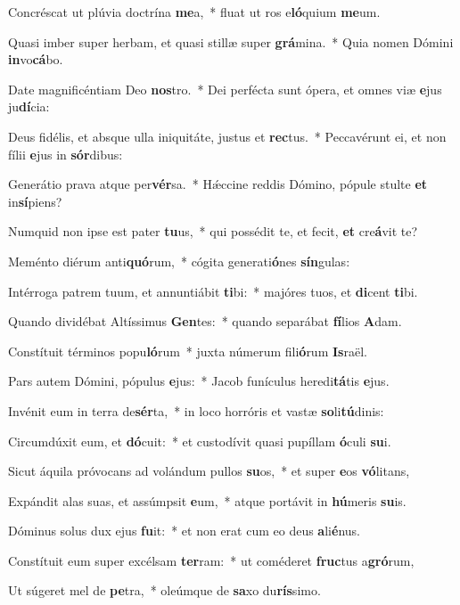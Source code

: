 \item Concréscat ut plúvia doctrína \textbf{me}a,~* fluat ut ros e\textbf{ló}quium \textbf{me}um.
\item Quasi imber super herbam, et quasi stillæ super \textbf{grá}mina.~* Quia nomen Dómini \textbf{in}vo\textbf{cá}bo.
\item Date magnificéntiam Deo \textbf{nos}tro.~* Dei perfécta sunt ópera, et omnes viæ \textbf{e}jus ju\textbf{dí}cia:
\item Deus fidélis, et absque ulla iniquitáte, justus et \textbf{rec}tus.~* Peccavérunt ei, et non fílii \textbf{e}jus in \textbf{sór}dibus:
\item Generátio prava atque per\textbf{vér}sa.~* Hǽccine reddis Dómino, pópule stulte \textbf{et} in\textbf{sí}piens?
\item Numquid non ipse est pater \textbf{tu}us,~* qui possédit te, et fecit, \textbf{et} cre\textbf{á}vit te?
\item Meménto diérum anti\textbf{quó}rum,~* cógita generati\textbf{ó}nes \textbf{sín}gulas:
\item Intérroga patrem tuum, et annuntiábit \textbf{ti}bi:~* majóres tuos, et \textbf{di}cent \textbf{ti}bi.
\item Quando dividébat Altíssimus \textbf{Gen}tes:~* quando separábat \textbf{fí}lios \textbf{A}dam.
\item Constítuit términos popu\textbf{ló}rum~* juxta númerum fili\textbf{ó}rum \textbf{Is}raël.
\item Pars autem Dómini, pópulus \textbf{e}jus:~* Jacob funículus heredi\textbf{tá}tis \textbf{e}jus.
\item Invénit eum in terra de\textbf{sér}ta,~* in loco horróris et vastæ \textbf{so}li\textbf{tú}dinis:
\item Circumdúxit eum, et \textbf{dó}cuit:~* et custodívit quasi pupíllam \textbf{ó}culi \textbf{su}i.
\item Sicut áquila próvocans ad volándum pullos \textbf{su}os,~* et super \textbf{e}os \textbf{vó}litans,
\item Expándit alas suas, et assúmpsit \textbf{e}um,~* atque portávit in \textbf{hú}meris \textbf{su}is.
\item Dóminus solus dux ejus \textbf{fu}it:~* et non erat cum eo deus \textbf{a}li\textbf{é}nus.
\item Constítuit eum super excélsam \textbf{ter}ram:~* ut coméderet \textbf{fruc}tus a\textbf{gró}rum,
\item Ut súgeret mel de \textbf{pe}tra,~* oleúmque de \textbf{sa}xo du\textbf{rís}simo.

